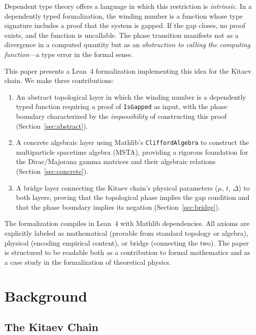 \documentclass[11pt,a4paper]{article}
\newcommand{\lean}[1]{\lstinline[language=Lean4]{#1}}
\begin{document}
Dependent type theory offers a language in which this restriction is \emph{intrinsic}. In a dependently typed formalization, the winding number is a function whose type signature includes a proof that the system is gapped. If the gap closes, no proof exists, and the function is uncallable. The phase transition manifests not as a divergence in a computed quantity but as an \emph{obstruction to calling the computing function}---a type error in the formal sense.

This paper presents a Lean~4 formalization implementing this idea for the Kitaev chain. We make three contributions:

\begin{enumerate}[label=(\arabic*)]
    \item An abstract topological layer in which the winding number is a dependently typed function requiring a proof of \lean{IsGapped} as input, with the phase boundary characterized by the \emph{impossibility} of constructing this proof (Section~\ref{sec:abstract}).
    
    \item A concrete algebraic layer using Mathlib's \lean{CliffordAlgebra} to construct the multiparticle spacetime algebra (MSTA), providing a rigorous foundation for the Dirac/Majorana gamma matrices and their algebraic relations (Section~\ref{sec:concrete}).
    
    \item A bridge layer connecting the Kitaev chain's physical parameters ($\mu$, $t$, $\Delta$) to both layers, proving that the topological phase implies the gap condition and that the phase boundary implies its negation (Section~\ref{sec:bridge}).
\end{enumerate}

The formalization compiles in Lean~4 with Mathlib dependencies. All axioms are explicitly labeled as mathematical (provable from standard topology or algebra), physical (encoding empirical content), or bridge (connecting the two). The paper is structured to be readable both as a contribution to formal mathematics and as a case study in the formalization of theoretical physics.

\section{Background}

\subsection{The Kitaev Chain}
\end{document}
